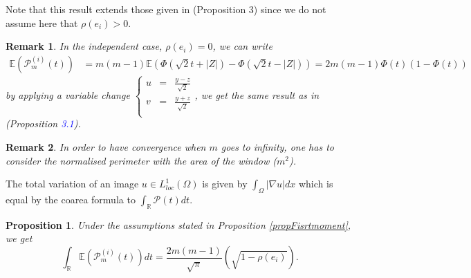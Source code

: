 \documentclass[12pt]{article}
\theoremstyle{Theorem}
\newtheorem{Proposition}[Theorem]{Proposition}
\newtheorem{remark}{Remark}
\begin{document}
Note that this result extends those given in \cite{HermineAgnes} (Proposition 3) since we do not assume here that $\rho(e_i) > 0$. 

\begin{remark}
\label{iidCase}
In the independent case, $\rho(e_i) = 0$, we can write
{\small
\begin{align*}
\mathbb{E}\left(\mathcal{P}^{\scriptscriptstyle  (i)}_{m}(t) \right) & = m(m-1)\mathbb{E}\left(\Phi\left(\sqrt{2}t + |Z|\right) - \Phi\left(\sqrt{2}t - |Z|\right)\right) = 2m(m-1)\Phi(t)\left(1-\Phi(t)\right) 
\end{align*}}
by applying a variable change {\small$\left\{\begin{array}{rcl}
u & = & \frac{y - z}{\sqrt{2}} \\
v & = & \frac{y+z}{\sqrt{2}} \\
\end{array}\right.$}, we get the same result as in \cite{Psymetrie} (Proposition \textcolor{blue}{3.1}).
\end{remark}
\begin{remark}
In order to have convergence when $m$ goes to infinity, one has to consider the normalised perimeter with the area of the window ($m^2$).
\end{remark}
The total variation of an image $u \in L^{1}_{loc}(\Omega)$ is given by $\int_{\Omega}|\nabla u|dx$ which is equal by the coarea formula to $\int_{\mathbb{R}}\mathcal{P}(t)dt$.
\begin{Proposition}
Under the assumptions stated in Proposition \ref{propFisrtmoment}, we get 
\begin{equation}
\label{totalvariation}
\int_{\mathbb{R}} \mathbb{E}\left(\mathcal{P}^{(i)}_{m}(t)\right) dt = \frac{2m(m-1)}{\sqrt{\pi}}\left(\sqrt{1-\rho(e_i)}  \right).
\end{equation}
\end{Proposition}
\end{document}
